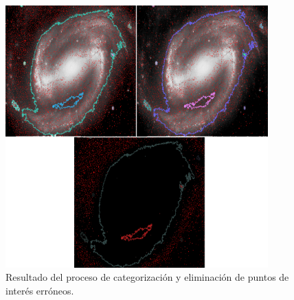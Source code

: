 \begin{enumerate}
\begin{enumerate}
\begin{figure}[!htb]
			\includegraphics[width=0.9\textwidth]{images/removeBadPoints3.png}
			\caption{\label{fig:removePointsConparation}{\small Resultado del proceso de categorización y eliminación de puntos de interés erróneos.}}
		\end{figure}


\end{enumerate}
\end{enumerate}
